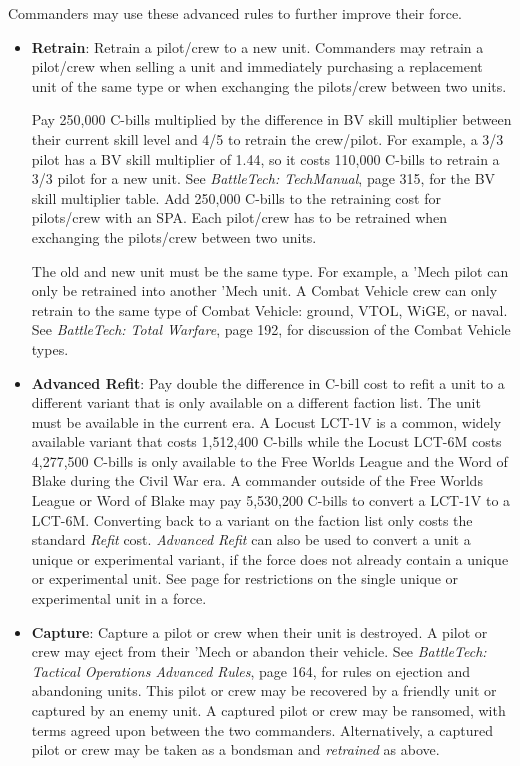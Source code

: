 \documentclass{article}
\begin{document}
Commanders may use these advanced rules to further improve their force.

\begin{itemize}

\item {\bfseries Retrain}: Retrain a pilot/crew to a new unit.
Commanders may retrain a pilot/crew when selling a unit and immediately purchasing a replacement unit of the same type or when exchanging the pilots/crew between two units.

Pay 250,000 C-bills multiplied by the difference in BV skill multiplier between their current skill level and 4/5 to retrain the crew/pilot.
For example, a 3/3 pilot has a BV skill multiplier of 1.44, so it costs 110,000 C-bills to retrain a 3/3 pilot for a new unit.
See \emph{BattleTech: TechManual}, page 315, for the BV skill multiplier table.
Add 250,000 C-bills to the retraining cost for pilots/crew with an SPA.
Each pilot/crew has to be retrained when exchanging the pilots/crew between two units.

The old and new unit must be the same type.
For example, a 'Mech pilot can only be retrained into another 'Mech unit.
A Combat Vehicle crew can only retrain to the same type of Combat Vehicle: ground, VTOL, WiGE, or naval.
See \emph{BattleTech: Total Warfare}, page 192, for discussion of the Combat Vehicle types.

\item {\bfseries Advanced Refit}: Pay double the difference in C-bill cost to refit a unit to a different variant that is only available on a different faction list.
The unit must be available in the current era.
A Locust LCT-1V is a common, widely available variant that costs 1,512,400 C-bills while the Locust LCT-6M costs 4,277,500 C-bills is only available to the Free Worlds League and the Word of Blake during the Civil War era.
A commander outside of the Free Worlds League or Word of Blake may pay 5,530,200 C-bills to convert a LCT-1V to a LCT-6M.
Converting back to a variant on the faction list only costs the standard \emph{Refit} cost.
\emph{Advanced Refit} can also be used to convert a unit a unique or experimental variant, if the force does not already contain a unique or experimental unit.
See page \pageref{subsec:force_construction} for restrictions on the single unique or experimental unit in a force.

\item {\bfseries Capture}: Capture a pilot or crew when their unit is destroyed.
A pilot or crew may eject from their 'Mech or abandon their vehicle.
See \emph{BattleTech: Tactical Operations Advanced Rules}, page 164, for rules on ejection and abandoning units.
This pilot or crew may be recovered by a friendly unit or captured by an enemy unit.
A captured pilot or crew may be ransomed, with terms agreed upon between the two commanders.
Alternatively, a captured pilot or crew may be taken as a bondsman and \emph{retrained} as above.


\end{itemize}
\end{document}

